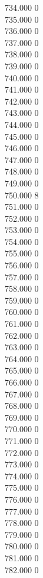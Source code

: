 { 734.000	0 \\
 735.000	0 \\
 736.000	0 \\
 737.000	0 \\
 738.000	0 \\
 739.000	0 \\
 740.000	0 \\
 741.000	0 \\
 742.000	0 \\
 743.000	0 \\
 744.000	0 \\
 745.000	0 \\
 746.000	0 \\
 747.000	0 \\
 748.000	0 \\
 749.000	0 \\
 750.000	8 \\
 751.000	0 \\
 752.000	0 \\
 753.000	0 \\
 754.000	0 \\
 755.000	0 \\
 756.000	0 \\
 757.000	0 \\
 758.000	0 \\
 759.000	0 \\
 760.000	0 \\
 761.000	0 \\
 762.000	0 \\
 763.000	0 \\
 764.000	0 \\
 765.000	0 \\
 766.000	0 \\
 767.000	0 \\
 768.000	0 \\
 769.000	0 \\
 770.000	0 \\
 771.000	0 \\
 772.000	0 \\
 773.000	0 \\
 774.000	0 \\
 775.000	0 \\
 776.000	0 \\
 777.000	0 \\
 778.000	0 \\
 779.000	0 \\
 780.000	0 \\
 781.000	0 \\
 782.000	0 \\
}
